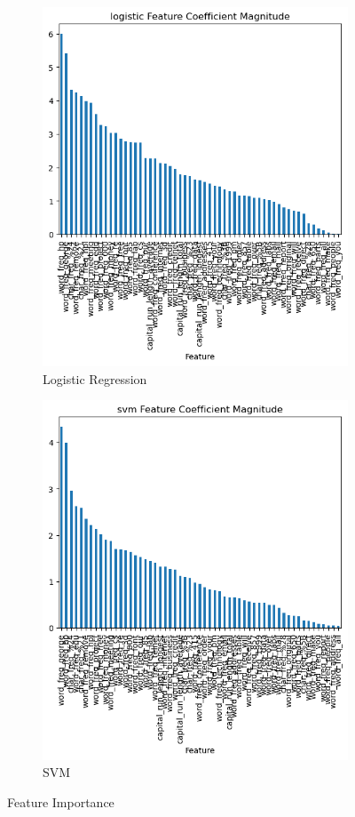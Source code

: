\documentclass[12pt]{article}
\begin{document}
\begin{figure}
  \begin{subfigure}{.5\textwidth}
  \includegraphics[width=.95\textwidth]{../results/logistic_features.png}
    \caption{Logistic Regression}
    \end{subfigure}%
  \begin{subfigure}{.5\textwidth}
    \includegraphics[width=.95\textwidth]{../results/svm_features.png}
    \caption{SVM}
  \end{subfigure}
  \caption{Feature Importance}
  \label{figure2}
\end{figure}
\end{document}
